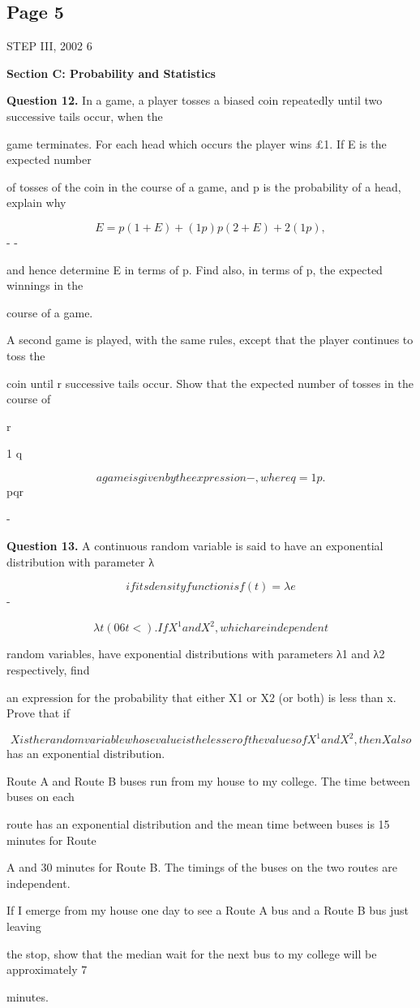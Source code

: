 \documentclass[12pt]{article}
\begin{document}
\subsection*{Page 5}
\begin{flushleft}
STEP III, 2002 6\par
\bigskip\textbf{Section C: Probability and Statistics}\par
\bigskip\textbf{Question 12.} In a game, a player tosses a biased coin repeatedly until two successive tails occur, when the\par
game terminates. For each head which occurs the player wins \pounds 1. If E is the expected number\par
of tosses of the coin in the course of a game, and p is the probability of a head, explain why\par
\[E = p (1 + E) + (1 p) p (2 + E) + 2 (1 p) ,\]
- -\par
and hence determine E in terms of p. Find also, in terms of p, the expected winnings in the\par
course of a game.\par
A second game is played, with the same rules, except that the player continues to toss the\par
coin until r successive tails occur. Show that the expected number of tosses in the course of\par
r\par
1 q\par
\[a game is given by the expression - , where q = 1 p.\]
pqr\par
-\par
\bigskip\textbf{Question 13.} A continuous random variable is said to have an exponential distribution with parameter λ\par
\[if its density function is f (t) = λe\]
-\par
\[λt (0 6 t < ) . If X^1 and X^2, which are independent\]
\infty\par
random variables, have exponential distributions with parameters λ1 and λ2 respectively, find\par
an expression for the probability that either X1 or X2 (or both) is less than x. Prove that if\par
\[X is the random variable whose value is the lesser of the values of X^1 and X^2, then X also\]
has an exponential distribution.\par
Route A and Route B buses run from my house to my college. The time between buses on each\par
route has an exponential distribution and the mean time between buses is 15 minutes for Route\par
A and 30 minutes for Route B. The timings of the buses on the two routes are independent.\par
If I emerge from my house one day to see a Route A bus and a Route B bus just leaving\par
the stop, show that the median wait for the next bus to my college will be approximately 7\par
minutes.\par
\end{flushleft}
\end{document}
